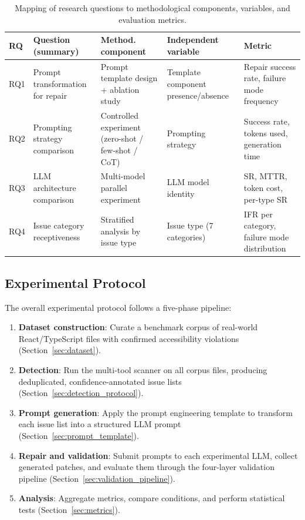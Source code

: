 \begin{table}[htbp]
\caption{Mapping of research questions to methodological components,
  variables, and evaluation metrics.}
\label{tab:rq_mapping}
\centering\small
\renewcommand{\arraystretch}{1.3}
\begin{tabular}{p{}p{}p{}p{}p{}}
\toprule
\textbf{RQ} & \textbf{Question (summary)} & \textbf{Method. component} &
\textbf{Independent variable} & \textbf{Metric} \\
\midrule
RQ1 & Prompt transformation for repair
    & Prompt template design + ablation study
    & Template component presence/absence
    & Repair success rate, failure mode frequency \\
RQ2 & Prompting strategy comparison
    & Controlled experiment (zero-shot / few-shot / CoT)
    & Prompting strategy
    & Success rate, tokens used, generation time \\
RQ3 & LLM architecture comparison
    & Multi-model parallel experiment
    & LLM model identity
    & SR, MTTR, token cost, per-type SR \\
RQ4 & Issue category receptiveness
    & Stratified analysis by issue type
    & Issue type (7 categories)
    & IFR per category, failure mode distribution \\
\bottomrule
\end{tabular}
\end{table}

\subsection{Experimental Protocol}

The overall experimental protocol follows a five-phase pipeline:

\begin{enumerate}
  \item \textbf{Dataset construction}: Curate a benchmark corpus of real-world
    React/TypeScript files with confirmed accessibility violations
    (Section~\ref{sec:dataset}).
  \item \textbf{Detection}: Run the multi-tool scanner on all corpus files,
    producing deduplicated, confidence-annotated issue lists
    (Section~\ref{sec:detection_protocol}).
  \item \textbf{Prompt generation}: Apply the prompt engineering template to
    transform each issue list into a structured LLM prompt
    (Section~\ref{sec:prompt_template}).
  \item \textbf{Repair and validation}: Submit prompts to each experimental
    LLM, collect generated patches, and evaluate them through the four-layer
    validation pipeline (Section~\ref{sec:validation_pipeline}).
  \item \textbf{Analysis}: Aggregate metrics, compare conditions, and perform
    statistical tests (Section~\ref{sec:metrics}).
\end{enumerate}

